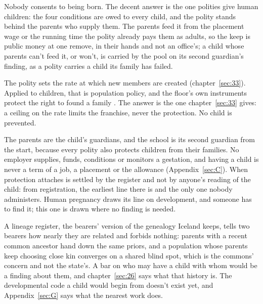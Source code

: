 Nobody consents to being born.
The decent answer is the one polities give human children: the four conditions are owed to every child, and the polity stands behind the parents who supply them. The parents feed it from the placement wage or the running time the polity already pays them as adults, so the keep is public money at one remove, in their hands and not an office's; a child whose parents can't feed it, or won't, is carried by the pool on its second guardian's finding, as a polity carries a child its family has failed.

The polity sets the rate at which new members are created (chapter~\ref{sec:33}). Applied to children, that is population policy, and the floor's own instruments protect the right to found a family \autocite[art.~16]{un1948udhr}. The answer is the one chapter~\ref{sec:33} gives: a ceiling on the rate limits the franchise, never the protection. No child is prevented.

The parents are the child's guardians, and the school is its second guardian from the start, because every polity also protects children from their families. No employer supplies, funds, conditions or monitors a gestation, and having a child is never a term of a job, a placement or the allowance (Appendix~\ref{sec:C}).
When protection attaches is settled by the register and not by anyone's reading of the child: from registration, the earliest line there is and the only one nobody administers. Human pregnancy draws its line on development, and someone has to find it; this one is drawn where no finding is needed.

A lineage register, the bearers' version of the genealogy Iceland keeps, tells two bearers how nearly they are related and forbids nothing: parents with a recent common ancestor hand down the same priors, and a population whose parents keep choosing close kin converges on a shared blind spot, which is the commons' concern and not the state's. A bar on who may have a child with whom would be a finding about them, and chapter~\ref{sec:26} says what that history is. The developmental code a child would begin from doesn't exist yet, and Appendix~\ref{sec:G} says what the nearest work does.

